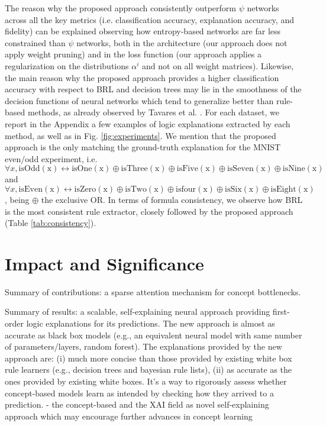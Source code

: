 \documentclass[withindex,glossary]{cam-thesis}
\theoremstyle{plain}
\theoremstyle{definition}
\theoremstyle{remark}
\begin{document}
The reason why the proposed approach consistently outperform $\psi$ networks across all the key metrics (i.e. classification accuracy, explanation accuracy, and fidelity) can be explained observing how entropy-based networks are far less constrained than $\psi$ networks, both in the architecture (our approach does not apply weight pruning) and in the loss function (our approach applies a regularization on the distributions $\alpha^i$ and not on all weight matrices). Likewise, the main reason why the proposed approach provides a higher classification accuracy with respect to BRL and decision trees may lie in the smoothness of the decision functions of neural networks which tend to generalize better than rule-based methods, as already observed by Tavares et al. \citep{tavares2020understanding}.
For each dataset, we report in the Appendix a few examples of logic explanations extracted by each method, as well as in Fig. \ref{fig:experiments}. We mention that the proposed approach is the only matching the %
ground-truth explanation for the MNIST even/odd experiment, i.e. $\forall x, \mathrm{isOdd(x)} \leftrightarrow \mathrm{isOne(x)} \oplus \mathrm{isThree(x)} \oplus \mathrm{isFive(x)} \oplus \mathrm{isSeven(x)} \oplus \mathrm{isNine(x)}$ and $\forall x, \mathrm{isEven(x)} \leftrightarrow \mathrm{isZero(x)} \oplus \mathrm{isTwo(x)} \oplus \mathrm{isfour(x)} \oplus \mathrm{isSix(x)} \oplus \mathrm{isEight(x)}$, being $\oplus$ the exclusive OR.
In terms of formula consistency, we observe how 
BRL is the most consistent rule extractor, closely followed by the proposed approach (Table \ref{tab:consistency}).

\section{Impact and Significance}
Summary of contributions: a sparse attention mechanism for concept bottlenecks.

Summary of results: a scalable, self-explaining neural approach providing first-order logic explanations for its predictions. The new approach is almost as accurate as black box models (e.g., an equivalent neural model with same number of parameters/layers, random forest). The explanations provided by the new approach are: (i) much more concise than those provided by existing white box rule learners (e.g., decision trees and bayesian rule lists), (ii) as accurate as the ones provided by existing white boxes. It's a way to rigorously assess whether concept-based models learn as intended by checking how they arrived to a prediction.
- the concept-based and the XAI field as novel self-explaining approach which may encourage further advances in concept learning
\end{document}

